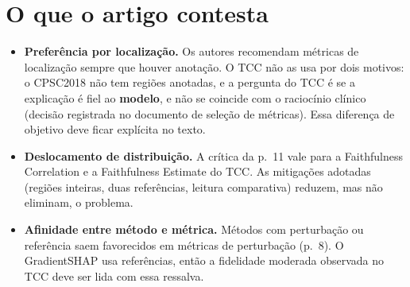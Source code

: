\documentclass[11pt,a4paper]{article}
\begin{document}
\section{O que o artigo contesta}
\begin{itemize}
\item \textbf{Preferência por localização.} Os autores recomendam métricas de localização sempre que houver anotação. O TCC não as usa por dois motivos: o CPSC2018 não tem regiões anotadas, e a pergunta do TCC é se a explicação é fiel ao \textbf{modelo}, e não se coincide com o raciocínio clínico (decisão registrada no documento de seleção de métricas). Essa diferença de objetivo deve ficar explícita no texto.
\item \textbf{Deslocamento de distribuição.} A crítica da p.~11 vale para a Faithfulness Correlation e a Faithfulness Estimate do TCC. As mitigações adotadas (regiões inteiras, duas referências, leitura comparativa) reduzem, mas não eliminam, o problema.
\item \textbf{Afinidade entre método e métrica.} Métodos com perturbação ou referência saem favorecidos em métricas de perturbação (p.~8). O GradientSHAP usa referências, então a fidelidade moderada observada no TCC deve ser lida com essa ressalva.
\end{itemize}
\end{document}
